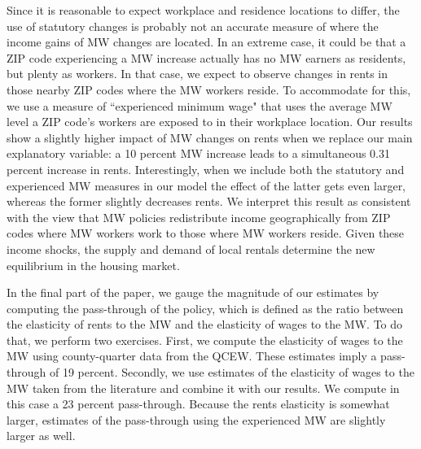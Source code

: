 Since it is reasonable to expect workplace and residence locations to differ, the use of 
statutory changes is probably not an accurate measure of where the income gains of MW 
changes are located.
In an extreme case, it could be that a ZIP code experiencing a MW increase actually has 
no MW earners as residents, but plenty as workers.
In that case, we expect to observe changes in rents in those nearby ZIP codes where the 
MW workers reside.
To accommodate for this, we use a measure of ``experienced minimum wage" that uses the 
average MW level a ZIP code's workers are exposed to in their workplace location.
Our results show a slightly higher impact of MW changes on rents when we replace our main 
explanatory variable: a 10 percent MW increase leads to a simultaneous 0.31 percent 
increase in rents.
Interestingly, when we include both the statutory and experienced MW measures in our 
model the effect of the latter gets even larger, whereas the former slightly decreases 
rents.
We interpret this result as consistent with the view that MW policies redistribute income 
geographically from ZIP codes where MW workers work to those where MW workers reside.
Given these income shocks, the supply and demand of local rentals determine the new 
equilibrium in the housing market.

In the final part of the paper, we gauge the magnitude of our estimates by computing the 
pass-through of the policy, which is defined as the ratio between the elasticity of rents 
to the MW and the elasticity of wages to the MW.
To do that, we perform two exercises.
First, we compute the elasticity of wages to the MW using county-quarter data from the 
QCEW. These estimates imply a pass-through of 19 percent.
Secondly, we use estimates of the elasticity of wages to the MW taken from the literature 
and combine it with our results. We compute in this case a 23 percent pass-through.
Because the rents elasticity is somewhat larger, estimates of the pass-through using the 
experienced MW are slightly larger as well.

